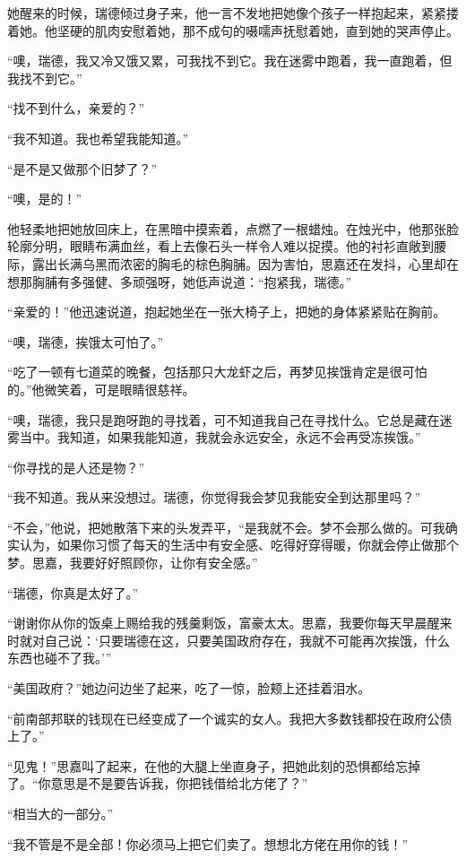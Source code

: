 \par 她醒来的时候，瑞德倾过身子来，他一言不发地把她像个孩子一样抱起来，紧紧搂着她。他坚硬的肌肉安慰着她，那不成句的嗫嚅声抚慰着她，直到她的哭声停止。
\par “噢，瑞德，我又冷又饿又累，可我找不到它。我在迷雾中跑着，我一直跑着，但我找不到它。”
\par “找不到什么，亲爱的？”
\par “我不知道。我也希望我能知道。”
\par “是不是又做那个旧梦了？”
\par “噢，是的！”
\par 他轻柔地把她放回床上，在黑暗中摸索着，点燃了一根蜡烛。在烛光中，他那张脸轮廓分明，眼睛布满血丝，看上去像石头一样令人难以捉摸。他的衬衫直敞到腰际，露出长满乌黑而浓密的胸毛的棕色胸脯。因为害怕，思嘉还在发抖，心里却在想那胸脯有多强健、多顽强呀，她低声说道：“抱紧我，瑞德。”
\par “亲爱的！”他迅速说道，抱起她坐在一张大椅子上，把她的身体紧紧贴在胸前。
\par “噢，瑞德，挨饿太可怕了。”
\par “吃了一顿有七道菜的晚餐，包括那只大龙虾之后，再梦见挨饿肯定是很可怕的。”他微笑着，可是眼睛很慈祥。
\par “噢，瑞德，我只是跑呀跑的寻找着，可不知道我自己在寻找什么。它总是藏在迷雾当中。我知道，如果我能知道，我就会永远安全，永远不会再受冻挨饿。”
\par “你寻找的是人还是物？”
\par “我不知道。我从来没想过。瑞德，你觉得我会梦见我能安全到达那里吗？”
\par “不会，”他说，把她散落下来的头发弄平，“是我就不会。梦不会那么做的。可我确实认为，如果你习惯了每天的生活中有安全感、吃得好穿得暖，你就会停止做那个梦。思嘉，我要好好照顾你，让你有安全感。”
\par “瑞德，你真是太好了。”
\par “谢谢你从你的饭桌上赐给我的残羹剩饭，富豪太太。思嘉，我要你每天早晨醒来时就对自己说：‘只要瑞德在这，只要美国政府存在，我就不可能再次挨饿，什么东西也碰不了我。'”
\par “美国政府？”她边问边坐了起来，吃了一惊，脸颊上还挂着泪水。
\par “前南部邦联的钱现在已经变成了一个诚实的女人。我把大多数钱都投在政府公债上了。”
\par “见鬼！”思嘉叫了起来，在他的大腿上坐直身子，把她此刻的恐惧都给忘掉了。“你意思是不是要告诉我，你把钱借给北方佬了？”
\par “相当大的一部分。”
\par “我不管是不是全部！你必须马上把它们卖了。想想北方佬在用你的钱！”
